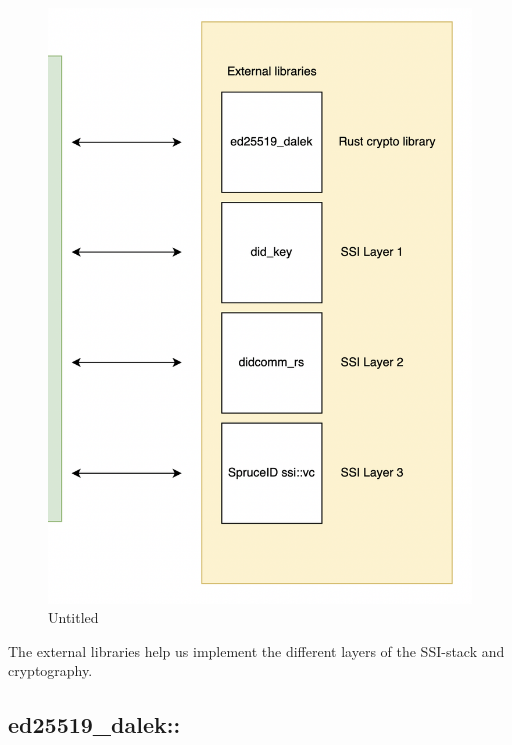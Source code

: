 \begin{figure}
\centering
\includegraphics{Architecture 1442df162dbe45f4a423ba37d3e12363/Untitled 6.png}
\caption{Untitled}
\end{figure}

The external libraries help us implement the different layers of the
SSI-stack and cryptography.

\hypertarget{ed25519_dalek}{%
\subsection{ed25519\_dalek::}\label{ed25519_dalek}}

